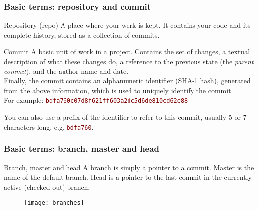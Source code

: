 \begin{frame}

\frametitle{Basic terms: repository and commit}
\begin{block}{Repository (repo)}
	A place where your work is kept. It contains your code and its complete history, stored as a collection of commits.
\end{block}

\begin{block}{Commit}
	A basic unit of work in a project. Contains the set of changes, a textual description of what these changes do, a reference to the previous state (the \textit{parent commit}), and the author name and date.\\ \smallskip Finally, the commit contains an alphanumeric identifier (SHA-1 hash), generated from the above information, which is used to uniquely identify the commit. \\For example: \textcolor{Maroon}{\texttt{bdfa760c07d8f621ff603a2dc5d6de810cd62e88}}
\smallskip

You can also use a prefix of the identifier to refer to this commit, usually 5 or 7 characters long, e.g. \textcolor{Maroon}{\texttt{bdfa760}}.
\end{block}
\end{frame}


\begin{frame}

\frametitle{Basic terms: branch, master and head}

\begin{block}{Branch, master and head}
A \alert{branch} is simply a pointer to a commit. \alert{Master} is the name of the default branch. \alert{Head} is a pointer to the last commit in the currently active (checked out) branch.
\end{block}

\begin{figure}
\texttt{[image: branches]}
\end{figure}

\end{frame}


